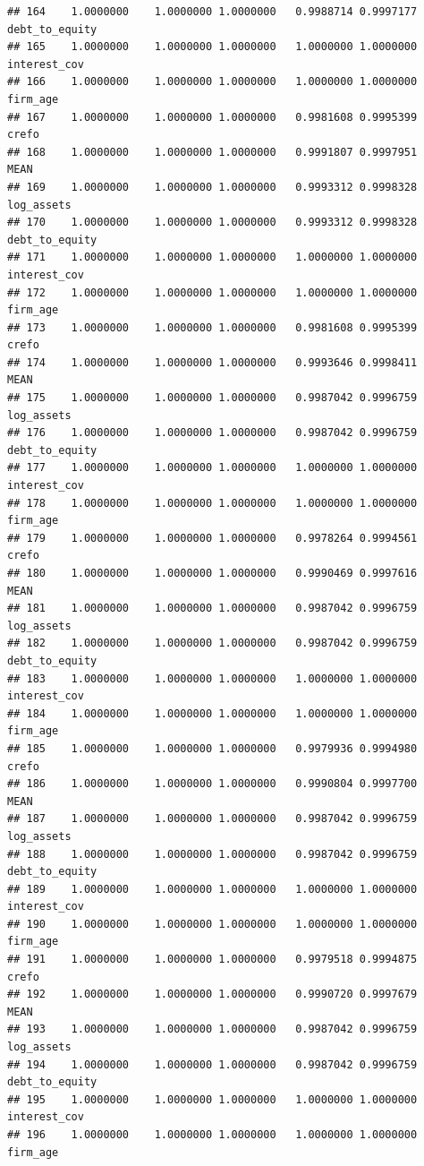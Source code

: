 \documentclass[
]{article}
\begin{document}
\begin{verbatim}
## 164    1.0000000    1.0000000 1.0000000   0.9988714 0.9997177 debt_to_equity
## 165    1.0000000    1.0000000 1.0000000   1.0000000 1.0000000   interest_cov
## 166    1.0000000    1.0000000 1.0000000   1.0000000 1.0000000       firm_age
## 167    1.0000000    1.0000000 1.0000000   0.9981608 0.9995399          crefo
## 168    1.0000000    1.0000000 1.0000000   0.9991807 0.9997951           MEAN
## 169    1.0000000    1.0000000 1.0000000   0.9993312 0.9998328     log_assets
## 170    1.0000000    1.0000000 1.0000000   0.9993312 0.9998328 debt_to_equity
## 171    1.0000000    1.0000000 1.0000000   1.0000000 1.0000000   interest_cov
## 172    1.0000000    1.0000000 1.0000000   1.0000000 1.0000000       firm_age
## 173    1.0000000    1.0000000 1.0000000   0.9981608 0.9995399          crefo
## 174    1.0000000    1.0000000 1.0000000   0.9993646 0.9998411           MEAN
## 175    1.0000000    1.0000000 1.0000000   0.9987042 0.9996759     log_assets
## 176    1.0000000    1.0000000 1.0000000   0.9987042 0.9996759 debt_to_equity
## 177    1.0000000    1.0000000 1.0000000   1.0000000 1.0000000   interest_cov
## 178    1.0000000    1.0000000 1.0000000   1.0000000 1.0000000       firm_age
## 179    1.0000000    1.0000000 1.0000000   0.9978264 0.9994561          crefo
## 180    1.0000000    1.0000000 1.0000000   0.9990469 0.9997616           MEAN
## 181    1.0000000    1.0000000 1.0000000   0.9987042 0.9996759     log_assets
## 182    1.0000000    1.0000000 1.0000000   0.9987042 0.9996759 debt_to_equity
## 183    1.0000000    1.0000000 1.0000000   1.0000000 1.0000000   interest_cov
## 184    1.0000000    1.0000000 1.0000000   1.0000000 1.0000000       firm_age
## 185    1.0000000    1.0000000 1.0000000   0.9979936 0.9994980          crefo
## 186    1.0000000    1.0000000 1.0000000   0.9990804 0.9997700           MEAN
## 187    1.0000000    1.0000000 1.0000000   0.9987042 0.9996759     log_assets
## 188    1.0000000    1.0000000 1.0000000   0.9987042 0.9996759 debt_to_equity
## 189    1.0000000    1.0000000 1.0000000   1.0000000 1.0000000   interest_cov
## 190    1.0000000    1.0000000 1.0000000   1.0000000 1.0000000       firm_age
## 191    1.0000000    1.0000000 1.0000000   0.9979518 0.9994875          crefo
## 192    1.0000000    1.0000000 1.0000000   0.9990720 0.9997679           MEAN
## 193    1.0000000    1.0000000 1.0000000   0.9987042 0.9996759     log_assets
## 194    1.0000000    1.0000000 1.0000000   0.9987042 0.9996759 debt_to_equity
## 195    1.0000000    1.0000000 1.0000000   1.0000000 1.0000000   interest_cov
## 196    1.0000000    1.0000000 1.0000000   1.0000000 1.0000000       firm_age

\end{verbatim}
\end{document}

